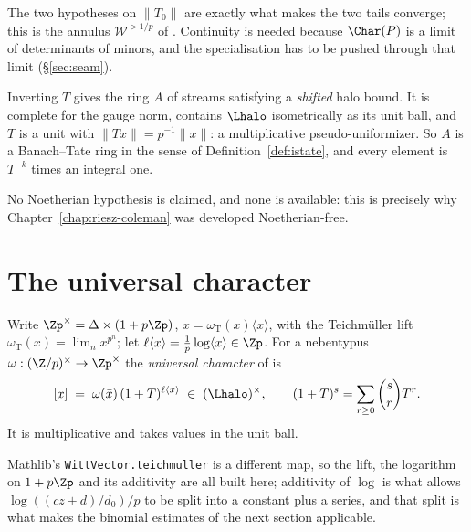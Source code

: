 The two hypotheses on $\lVert T_0\rVert$ are exactly what makes the two tails converge; this is
the annulus $\mathcal{W}^{>1/p}$ of \cite{LWX}.  Continuity is needed because $\Char(P)$ is a
limit of determinants of minors, and the specialisation has to be pushed through that limit
(\S\ref{sec:seam}).

\begin{proposition}[{The Banach--Tate ring $A = \Lhalo[1/T]$}]
  \label{prop:halotate}
  \leanok
  Inverting $T$ gives the ring $A$ of streams satisfying a \emph{shifted} halo bound.  It is
  complete for the gauge norm, contains $\Lhalo$ isometrically as its unit ball, and $T$ is a
  unit with $\lVert Tx\rVert = p^{-1}\lVert x\rVert$: a multiplicative pseudo-uniformizer.  So
  $A$ is a Banach--Tate ring in the sense of Definition~\ref{def:istate}, and every element is
  $T^{-k}$ times an integral one.
\end{proposition}

No Noetherian hypothesis is claimed, and none is available: this is precisely why
Chapter~\ref{chap:riesz-coleman} was developed Noetherian-free.

\section{The universal character}

\begin{definition}
  \label{def:univchar}
  \leanok
  Write $\Zp^{\times} = \Delta \times (1+p\Zp)$, $x = \omega_{\mathrm{T}}(x)\langle x\rangle$,
  with the Teichm\"uller lift $\omega_{\mathrm{T}}(x) = \lim_n x^{p^n}$; let
  $\ell\langle x\rangle = \tfrac1p\log\langle x\rangle \in \Zp$.  For a nebentypus
  $\omega : (\Z/p)^{\times}\to\Zp^{\times}$ the \emph{universal character} of
  \cite[Notation 2.1]{LWX} is
  \[
    [x] \;=\; \omega(\bar x)\,(1+T)^{\ell\langle x\rangle} \;\in\; (\Lhalo)^{\times},
    \qquad (1+T)^{s} = \sum_{r\geq 0}\binom{s}{r}T^{r} .
  \]
  It is multiplicative and takes values in the unit ball.
\end{definition}

Mathlib's \texttt{WittVector.teichmuller} is a different map, so the lift, the logarithm on
$1+p\Zp$ and its additivity are all built here; additivity of $\log$ is what allows
$\log((cz+d)/d_0)/p$ to be split into a constant plus a series, and that split is what makes the
binomial estimates of the next section applicable.


